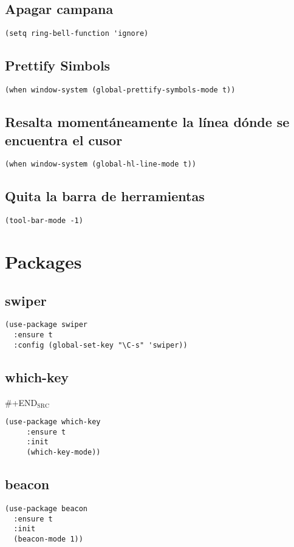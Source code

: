 \documentclass[11pt]{article}
\begin{document}
\subsection{Apagar campana}
\label{sec-4-7}
\begin{verbatim}
(setq ring-bell-function 'ignore)
\end{verbatim}
\subsection{Prettify Simbols}
\label{sec-4-8}
\begin{verbatim}
(when window-system (global-prettify-symbols-mode t))
\end{verbatim}
\subsection{Resalta momentáneamente la línea dónde se encuentra el cusor}
\label{sec-4-9}
\begin{verbatim}
(when window-system (global-hl-line-mode t))
\end{verbatim}

\subsection{Quita la barra de herramientas}
\label{sec-4-10}
\begin{verbatim}
(tool-bar-mode -1)
\end{verbatim}
\section{Packages}
\label{sec-5}
\subsection{swiper}
\label{sec-5-1}
\begin{verbatim}
(use-package swiper
  :ensure t
  :config (global-set-key "\C-s" 'swiper))
\end{verbatim}
\subsection{which-key}
\label{sec-5-2}
\#+END$_{\text{SRC}}$
\begin{verbatim}
(use-package which-key
     :ensure t
     :init
     (which-key-mode))
\end{verbatim}
\subsection{beacon}
\label{sec-5-3}
\begin{verbatim}
(use-package beacon
  :ensure t
  :init
  (beacon-mode 1))
\end{verbatim}
\end{document}

